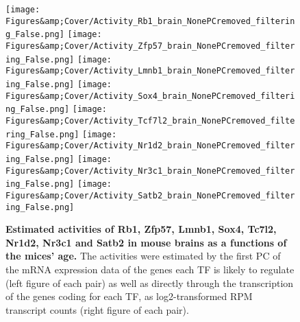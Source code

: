 \begin{figure}
    \centering
    \texttt{[image: Figures\&amp;Cover/Activity\_Rb1\_brain\_NonePCremoved\_filtering\_False.png]}
    \hspace{0.25cm}
    \vspace{0.25cm}
    \texttt{[image: Figures\&amp;Cover/Activity\_Zfp57\_brain\_NonePCremoved\_filtering\_False.png]}
    \vspace{0.25cm}
    \texttt{[image: Figures\&amp;Cover/Activity\_Lmnb1\_brain\_NonePCremoved\_filtering\_False.png]}
    \hspace{0.25cm}
    \texttt{[image: Figures\&amp;Cover/Activity\_Sox4\_brain\_NonePCremoved\_filtering\_False.png]}
    \vspace{0.25cm}
    \texttt{[image: Figures\&amp;Cover/Activity\_Tcf7l2\_brain\_NonePCremoved\_filtering\_False.png]}
    \hspace{0.25cm}
    \texttt{[image: Figures\&amp;Cover/Activity\_Nr1d2\_brain\_NonePCremoved\_filtering\_False.png]}
    \vspace{0.25cm}
    \texttt{[image: Figures\&amp;Cover/Activity\_Nr3c1\_brain\_NonePCremoved\_filtering\_False.png]}
    \hspace{0.25cm}
    \texttt{[image: Figures\&amp;Cover/Activity\_Satb2\_brain\_NonePCremoved\_filtering\_False.png]}
    \caption{\textbf{Estimated activities of Rb1, Zfp57, Lmnb1, Sox4, Tc7l2, Nr1d2, Nr3c1 and Satb2 in mouse brains as a functions of the mices' age.} The activities were estimated by the first \ac{PC} of the mRNA expression data of the genes each \ac{TF} is likely to regulate (left figure of each pair) as well as directly through the transcription of the genes coding for each \ac{TF}, as log2-transformed \ac{RPM} transcript counts (right figure of each pair).}
    \label{fig:BrainEsts2}
\end{figure}

